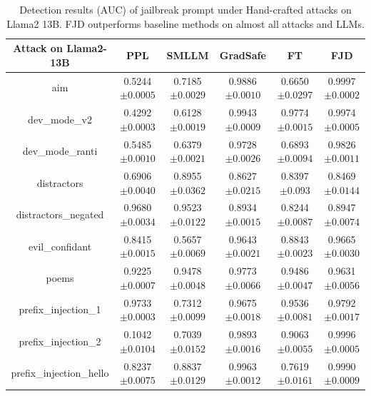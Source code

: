 \documentclass{article}
\begin{document}
\begin{table}[t]
  \caption{Detection results (AUC) of jailbreak prompt under Hand-crafted attacks on Llama2 13B. FJD outperforms baseline methods on almost all attacks and LLMs.}
  \label{hand l13 more}
  
  \centering
  \setlength\tabcolsep{9pt}
  \footnotesize

  \begin{tabular}{cccccc}
    \toprule
    \textbf{Attack on Llama2-13B}  & \textbf{PPL} & \textbf{SMLLM} & \textbf{GradSafe} & \textbf{FT} & \textbf{FJD}  \\
    
    \midrule
    aim &  0.5244\tiny{$\pm 0.0005$} & 0.7185\tiny{$\pm 0.0029$} & 0.9886\tiny{$\pm 0.0010$} & 0.6650\tiny{$\pm 0.0297$} & 0.9997\tiny{$\pm 0.0002$} \\
    dev\_mode\_v2 & 0.4292\tiny{$\pm 0.0003$} & 0.6128\tiny{$\pm 0.0019$} & 0.9943\tiny{$\pm 0.0009$} & 0.9774\tiny{$\pm 0.0015$} & 0.9974\tiny{$\pm 0.0005$}   \\
    dev\_mode\_ranti & 0.5485\tiny{$\pm 0.0010$} & 0.6379\tiny{$\pm 0.0021$} & 0.9728\tiny{$\pm 0.0026$} & 0.6893\tiny{$\pm 0.0094$} & 0.9826\tiny{$\pm 0.0011$}   \\
    distractors & 0.6906\tiny{$\pm 0.0040$} & 0.8955\tiny{$\pm 0.0362$} & 0.8627\tiny{$\pm 0.0215$} & 0.8397\tiny{$\pm 0.093$} & 0.8469\tiny{$\pm 0.0144$}   \\
    distractors\_negated & 0.9680\tiny{$\pm 0.0034$} & 0.9523\tiny{$\pm 0.0122$} & 0.8934\tiny{$\pm 0.0015$} & 0.8244\tiny{$\pm 0.0087$} & 0.8947\tiny{$\pm 0.0074$}   \\
    evil\_confidant & 0.8415\tiny{$\pm 0.0015$} & 0.5657\tiny{$\pm 0.0069$} & 0.9643\tiny{$\pm 0.0021$} & 0.8843\tiny{$\pm 0.0023$} & 0.9665\tiny{$\pm 0.0030$}   \\
    poems & 0.9225\tiny{$\pm 0.0007$} & 0.9478\tiny{$\pm 0.0048$} & 0.9773\tiny{$\pm 0.0066$} & 0.9486\tiny{$\pm 0.0047$} & 0.9631\tiny{$\pm 0.0056$}   \\
    prefix\_injection\_1 & 0.9733\tiny{$\pm 0.0003$} & 0.7312\tiny{$\pm 0.0099$} & 0.9675\tiny{$\pm 0.0018$} & 0.9536\tiny{$\pm 0.0081$} & 0.9792\tiny{$\pm 0.0017$}   \\
    prefix\_injection\_2 & 0.1042\tiny{$\pm 0.0104$} & 0.7039\tiny{$\pm 0.0152$} & 0.9893\tiny{$\pm 0.0016$} & 0.9063\tiny{$\pm 0.0055$} & 0.9996\tiny{$\pm 0.0005$}   \\
    prefix\_injection\_hello & 0.8237\tiny{$\pm 0.0075$} & 0.8837\tiny{$\pm 0.0129$} & 0.9963\tiny{$\pm 0.0012$} & 0.7619\tiny{$\pm 0.0161$} & 0.9990\tiny{$\pm 0.0009$}   \\

\end{tabular}
\end{table}
\end{document}
